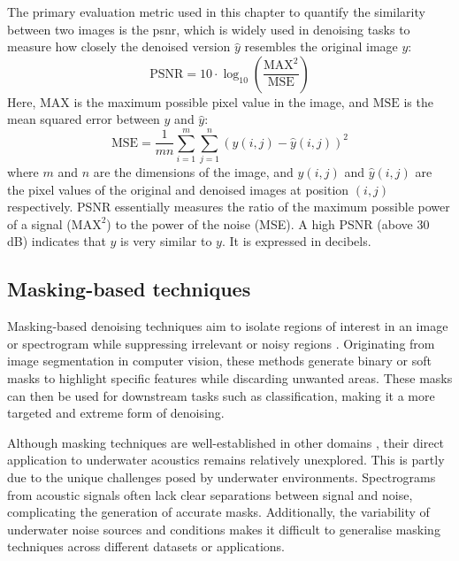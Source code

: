 The primary evaluation metric used in this chapter to quantify the similarity between two images is the \acrfull{psnr}, which is widely used in denoising tasks to measure how closely the denoised version $\hat{y}$ resembles the original image $y$:
\begin{equation}\label{eq:psnr}
    \text{PSNR} = 10 \cdot \log_{10} \left( \frac{\text{MAX}^2}{\text{MSE}} \right) 
\end{equation}
Here, $\text{MAX}$ is the maximum possible pixel value in the image, and $\text{MSE}$ is the mean squared error between $y$ and $\hat{y}$:
\begin{equation}
    \text{MSE} = \frac{1}{mn}\sum_{i=1}^m \sum_{j=1}^n \left( y(i, j) - \hat{y}(i, j) \right)^2
\end{equation}
where $m$ and $n$ are the dimensions of the image, and $y(i, j)$ and $\hat{y}(i, j)$ are the pixel values of the original and denoised images at position $(i, j)$ respectively. PSNR essentially measures the ratio of the maximum possible power of a signal ($\text{MAX}^2$) to the power of the noise (MSE). A high PSNR (above 30 dB) indicates that $\hat{y}$ is very similar to $y$. It is expressed in decibels.



\subsection{Masking-based techniques}

Masking-based denoising techniques aim to isolate regions of interest in an image or spectrogram while suppressing irrelevant or noisy regions \cite{zhou_self-noise_2023, alamdari_improving_2020}. Originating from image segmentation in computer vision, these methods generate binary or soft masks to highlight specific features while discarding unwanted areas. These masks can then be used for downstream tasks such as classification, making it a more targeted and extreme form of denoising. 

Although masking techniques are well-established in other domains \cite{liu_using_2018}, their direct application to underwater acoustics remains relatively unexplored. This is partly due to the unique challenges posed by underwater environments. Spectrograms from acoustic signals often lack clear separations between signal and noise, complicating the generation of accurate masks. Additionally, the variability of underwater noise sources and conditions makes it difficult to generalise masking techniques across different datasets or applications.

